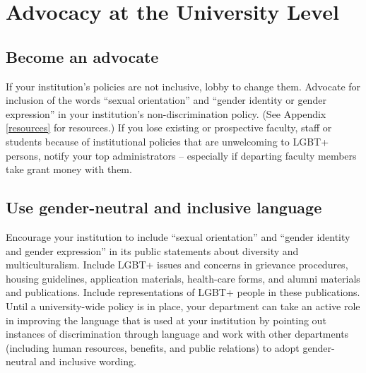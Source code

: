 %

\chapter{Advocacy at the University Level}	%
\label{univ-advocacy}		%
\normalsize			%


\section {Become an advocate}
\label{become-advocate}
If your institution's policies are not inclusive, lobby to change them.  Advocate for inclusion of the words ``sexual orientation'' and ``gender identity or gender expression'' in your institution's non-discrimination policy.  (See Appendix \ref{resources} for resources.)  If you lose existing or prospective faculty, staff or students because of institutional policies that are unwelcoming to LGBT+ persons, notify your top administrators -- especially if departing faculty members take grant money with them.


\section {Use gender-neutral and inclusive language}
\label{univ-language}
Encourage your institution to include ``sexual orientation'' and ``gender identity and gender expression'' in its public statements about diversity and multiculturalism.  Include LGBT+ issues and concerns in grievance procedures, housing guidelines, application materials, health-care forms, and alumni materials and publications.  Include representations of LGBT+ people in these publications.  Until a university-wide policy is in place, your department can take an active role in improving the language that is used at your institution by pointing out instances of discrimination through language and work with other departments (including human resources, benefits, and public relations) to adopt gender-neutral and inclusive wording.


